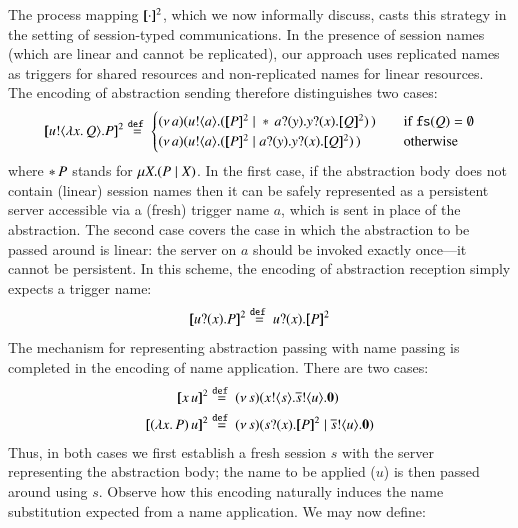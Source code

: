 \documentclass[preprint,11pt]{elsarticle}
\begin{document}
{The process mapping $[\!\![\cdot]\!\!]^2$, which we now informally discuss,
casts this strategy in the setting of session-typed communications. 
In the presence of session names (which are linear  and cannot be replicated),
our
approach %
 uses replicated names
as triggers for shared resources and non-replicated names
for linear resources. The encoding of abstraction sending therefore distinguishes two cases:
$$
	\pmap{\bout{u}{\abs{x}{Q}} P}{2}  \defeq  
	\begin{cases}
		\newsp{a}{\bout{u}{a} (\pmap{P}{2} \Par \repl{} \binp{a}{y} \binp{y}{x} \pmap{Q}{2})\,}\quad
		& \text{if $\fs{Q} = \emptyset$}
		\\
		\newsp{a}{\bout{u}{a} (\pmap{P}{2} \Par \binp{a}{y} \binp{y}{x} \pmap{Q}{2})\,}\quad
		& \text{otherwise} %
	\end{cases}
	$$
	where  $\ast\,{} P$ stands for $\mu X. (P \;|\; X)$.
	In the first case, if the abstraction body does not contain (linear) session names then it can be safely 
	represented as a persistent server accessible via a (fresh) trigger name $a$, which is sent in place of the abstraction. The second case covers the case in which the abstraction to be passed around 
	is linear: the server on $a$ should be invoked exactly once---it cannot be persistent.
	In this scheme, the encoding of abstraction reception simply expects a trigger name:
   $$
   \pmap{\binp{u}{x} P}{2} \defeq  \binp{u}{x} \pmap{P}{2}
   $$
	The mechanism for representing abstraction passing with name passing is completed in the encoding of name application. There are two cases:
	\begin{align*}
		\pmap{\appl{x}{u}}{2} &\defeq \newsp{s}{\bout{x}{s} \bout{\dual{s}}{u} \inact}
	\\
	\pmap{\appl{(\abs{x}{P})}{u}}{2} & \defeq  %
	\newsp{s}{\binp{s}{x} \pmap{P}{2} \Par \bout{\dual{s}}{u} \inact}
\end{align*}
Thus,   in both cases we first establish a fresh session $s$   with the server representing the abstraction body;
the name to be applied ($u$) is then passed around using $s$.
Observe how %
this encoding
naturally induces the name substitution expected from a name application.
We may now define:


}
\end{document}
